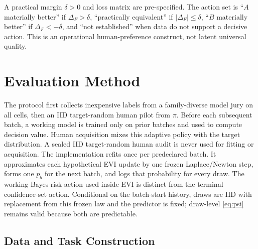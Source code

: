 \documentclass{article}
\begin{document}
A practical margin $\delta>0$ and loss matrix are pre-specified. The action set
is ``$A$ materially better'' if $\Delta_F>\delta$, ``practically equivalent''
if $|\Delta_F|\le\delta$, ``$B$ materially better'' if
$\Delta_F<-\delta$, and ``not established'' when data do not support a
decisive action. This is an operational human-preference construct, not latent
universal quality.

\section{Evaluation Method}
\label{sec:method}

The protocol first collects inexpensive labels from a family-diverse model
jury on all cells, then an IID target-random human pilot from $\pi$. Before each
subsequent batch, a working model is trained only on prior batches and used to
compute decision value. Human acquisition mixes this adaptive policy with the
target distribution. A sealed IID target-random human audit is never
used for fitting or acquisition.
The implementation refits once per predeclared batch. It approximates each
hypothetical EVI update by one frozen Laplace/Newton step, forms one $p_b$ for
the next batch, and logs that probability for every draw. The working
Bayes-risk action used inside EVI is distinct from the terminal confidence-set
action. Conditional on the batch-start history, draws are IID with replacement
from this frozen law and the predictor is fixed; draw-level \cref{eq:psi}
remains valid because both are predictable.

\subsection{Data and Task Construction}
\end{document}
